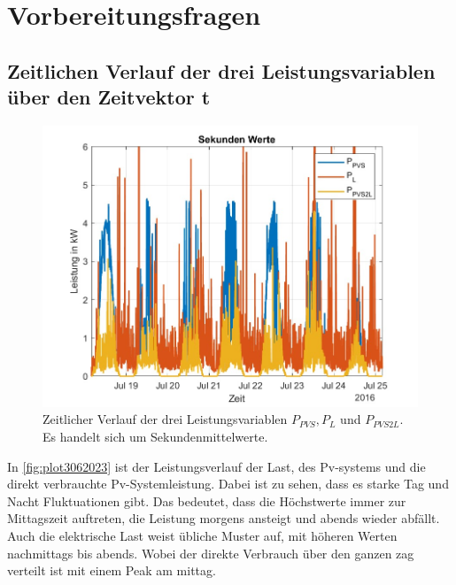 \newpage
\section{Vorbereitungsfragen}
\subsection{Zeitlichen Verlauf der
drei Leistungsvariablen über den Zeitvektor t}
\begin{figure}[H]
    \centering
    \includegraphics[width=\textwidth]{Abbildungen/plot.jpg}
    \caption{Zeitlicher Verlauf der drei Leistungsvariablen $P_{PVS}, P_{L}$ und $P_{PVS2L}$. Es handelt sich um Sekundenmittelwerte.}
    \label{fig:plot3062023}
\end{figure}
In \autoref{fig:plot3062023} ist der Leistungsverlauf der Last, des Pv-systems und die direkt verbrauchte Pv-Systemleistung. Dabei ist zu sehen, dass es starke Tag und Nacht Fluktuationen gibt. 
Das bedeutet, dass die Höchstwerte immer zur Mittagszeit auftreten, die Leistung morgens ansteigt und abends wieder abfällt. Auch die elektrische Last weist übliche Muster auf, mit höheren Werten nachmittags bis abends. 
Wobei der direkte Verbrauch über den ganzen zag verteilt ist mit einem Peak am mittag.
